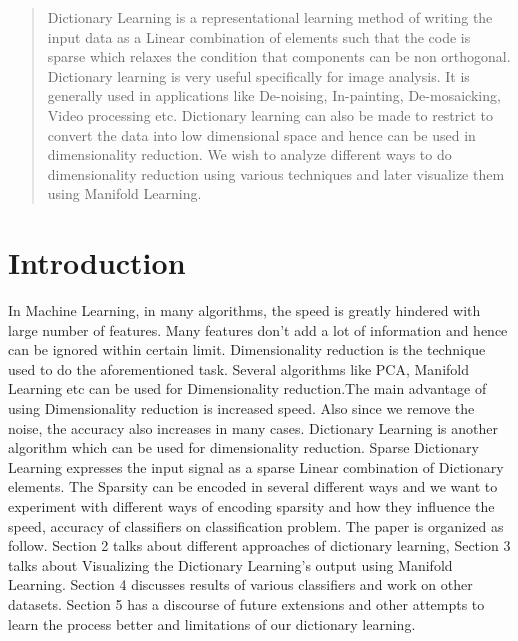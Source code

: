 \documentclass{article}
\begin{document}
\printAffiliationsAndNotice{\icmlEqualContribution} %

\begin{abstract} 
Dictionary Learning is a representational learning method of writing the input data as a Linear combination of elements such that the code is sparse which relaxes the condition that components can be non orthogonal. Dictionary learning is very useful specifically for image analysis. It is generally used in applications like De-noising, In-painting, De-mosaicking, Video processing etc. Dictionary learning can also be made to restrict to convert the data into low dimensional space and hence can be used in dimensionality reduction. We wish to analyze different ways to do dimensionality reduction using various techniques and later visualize them using Manifold Learning.
\end{abstract} 

\section{Introduction}
\label{introduction}

In Machine Learning, in many algorithms, the speed is greatly hindered with large number of features. Many features don't add a lot of information and hence can be ignored within certain limit. Dimensionality reduction is the technique used to do the aforementioned task. Several algorithms like PCA, Manifold Learning etc can be used for Dimensionality reduction.The main advantage of using Dimensionality reduction is increased speed. Also since we remove the noise, the accuracy also increases in many cases. Dictionary Learning is another algorithm which can be used for dimensionality reduction.  Sparse Dictionary Learning expresses the input signal as a sparse Linear combination of Dictionary elements. The Sparsity can be encoded in several different ways and we want to experiment with different ways of encoding sparsity and how they influence the speed, accuracy of classifiers on classification problem. The paper is organized as follow. Section 2 talks about different approaches of dictionary learning, Section 3 talks about Visualizing the Dictionary Learning's output using Manifold Learning. Section 4 discusses results of various classifiers and work on other datasets. Section 5 has a discourse of future extensions and other attempts to learn the process better and limitations of our dictionary learning.
\end{document}
